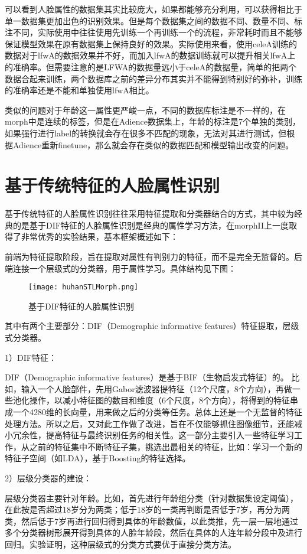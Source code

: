 可以看到人脸属性的数据集其实比较庞大，如果都能够充分利用，可以获得相比于单一数据集更加出色的识别效果。但是每个数据集之间的数据不同、数量不同、标注不同，实际使用中往往使用先训练一个再训练一个的流程，非常耗时而且不能够保证模型效果在原有数据集上保持良好的效果。实际使用来看，使用celeA训练的数据对于lfwA的数据效果并不好，而加入lfwA的数据训练就可以提升相关lfwA上的准确率。但需要注意的是LFWA的数据量远小于celeA的数据量，简单的把两个数据合起来训练，两个数据库之前的差异分布其实并不能得到特别好的弥补，训练的准确率还是不能和单独使用lfwA相比。

类似的问题对于年龄这一属性更严峻一点，不同的数据库标注是不一样的，在morph中是连续的标签，但是在Adience数据集上，年龄的标注是7个单独的类别，如果强行进行label的转换就会存在很多不匹配的现象，无法对其进行测试，但根据Adience重新finetune，那么就会存在类似的数据匹配和模型输出改变的问题。

\section{基于传统特征的人脸属性识别}
基于传统特征的人脸属性识别\cite{HUHAN}往往采用特征提取和分类器结合的方式，其中较为经典的是基于DIF特征的人脸属性识别是经典的属性学习方法，在morphII上一度取得了非常优秀的实验结果，基本框架概述如下：

前端为特征提取阶段，旨在提取对属性有判别力的特征，而不是完全无监督的。后端连接一个层级式的分类器，用于属性学习。具体结构见下图：
\begin{figure}[!ht]
 \centering
	\texttt{[image: huhanSTLMorph.png]}
	\caption{基于DIF特征的人脸属性识别}
\end{figure}

其中有两个主要部分：DIF（Demographic informative features）特征提取，层级式分类器。

1）DIF特征：

DIF（Demographic informative features）是基于BIF（生物启发式特征）的。
比如，输入一个人脸部件，先用Gabor滤波器提特征（12个尺度，8个方向），再做一些池化操作，以减小特征图的数目和维度（6个尺度，8个方向），将得到的特征串成一个4280维的长向量，用来做之后的分类等任务。总体上还是一个无监督的特征处理方法。所以之后，又对此工作做了改进，旨在不仅能够抓住图像细节，还能减小冗余性，提高特征与最终识别任务的相关性。这一部分主要引入一些特征学习工作，从之前的特征集中不断特征子集，挑选出最相关的特征，比如：学习一个新的特征子空间（如LDA），基于Boosting的特征选择。

2）层级分类器的建设：

层级分类器主要针对年龄。比如，首先进行年龄组分类（针对数据集设定阈值），在此按是否超过18岁分为两类；低于18岁的一类再判断是否低于7岁，再分为两类，然后低于7岁再进行回归得到具体的年龄数值，以此类推，先一层一层地通过多个分类器树形展开得到具体的人脸年龄段，然后在具体的人连年龄分段中及进行回归。实验证明，这种层级式的分类方式要优于直接分类方法。

